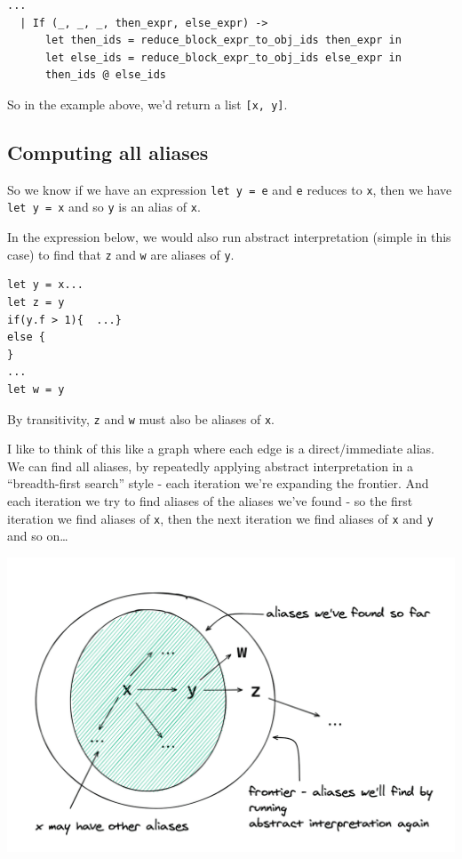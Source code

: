 %

\begin{lstlisting}[language=caml]
...
  | If (_, _, _, then_expr, else_expr) ->
      let then_ids = reduce_block_expr_to_obj_ids then_expr in
      let else_ids = reduce_block_expr_to_obj_ids else_expr in
      then_ids @ else_ids
\end{lstlisting}

So in the example above, we'd return a list \texttt{{[}x,\ y{]}}.

\hypertarget{computing-all-aliases}{%
\subsection{\texorpdfstring{\protect\hyperlink{computing-all-aliases}{}Computing
all aliases}{Computing all aliases}}\label{computing-all-aliases}}

So we know if we have an expression \texttt{let\ y\ =\ e} and \texttt{e}
reduces to \texttt{x}, then we have \texttt{let\ y\ =\ x} and so
\texttt{y} is an alias of \texttt{x}.

In the expression below, we would also run abstract interpretation
(simple in this case) to find that \texttt{z} and \texttt{w} are aliases
of \texttt{y}.


\begin{verbatim}
let y = x...
let z = y
if(y.f > 1){  ...}
else {
}
...
let w = y
\end{verbatim}

By transitivity, \texttt{z} and \texttt{w} must also be aliases of
\texttt{x}.

I like to think of this like a graph where each edge is a
direct/immediate alias. We can find all aliases, by repeatedly applying
abstract interpretation in a ``breadth-first search'' style - each
iteration we're expanding the frontier. And each iteration we try to
find aliases of the aliases we've found - so the first iteration we find
aliases of \texttt{x}, then the next iteration we find aliases of
\texttt{x} and \texttt{y} and so on\ldots{}

{
\href{https://mukulrathi.com/static/e996478c0eaa723fc8028caa72847284/191e2/alias-frontier.png}{{}
\includegraphics[width=\linewidth]{05_files/alias-frontier.png}} }

